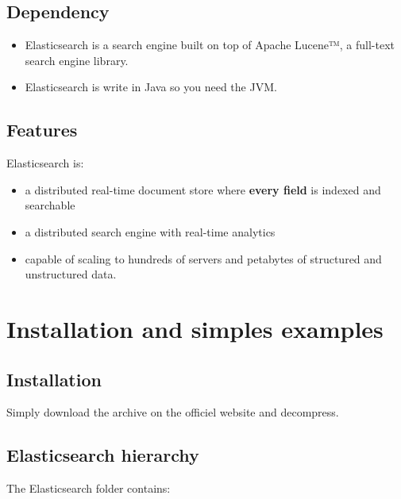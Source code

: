 \documentclass{article}%
\begin{document}
\subsection{Dependency}

\begin{itemize}
	\item Elasticsearch is a search engine built on top of Apache Lucene™, a full-text search engine library.
	\item Elasticsearch is write in Java so you need the JVM.
\end{itemize}

\subsection{Features}

Elasticsearch is:
\begin{itemize}
	\item a distributed real-time document store where \textbf{every field} is indexed and searchable
	\item a distributed search engine with real-time analytics
	\item capable of scaling to hundreds of servers and petabytes of structured and unstructured data.
\end{itemize}

\section{Installation and simples examples}

\subsection{Installation}

Simply download the archive on the officiel website and decompress.

\subsection{Elasticsearch hierarchy}

The Elasticsearch folder contains:
\end{document}
